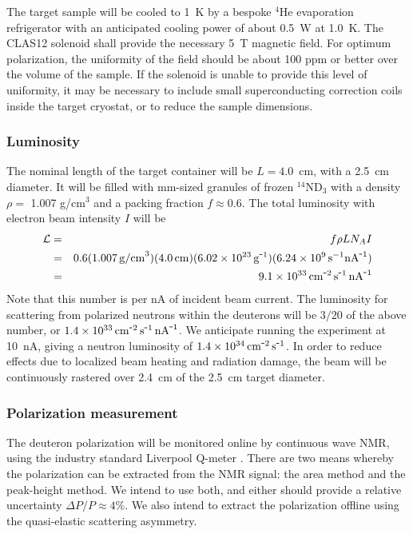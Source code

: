 The target sample will be cooled to 1~K by a bespoke $^4$He evaporation refrigerator with an anticipated cooling power of about 0.5~W at 1.0~K.  The CLAS12 solenoid shall provide the necessary 5~T magnetic field.  For optimum polarization, the uniformity of the field should be about 100 ppm or better over the volume of the sample.  If the solenoid is unable to provide this level of uniformity, it may be necessary to include small superconducting correction
coils inside the target cryostat, or to reduce the sample dimensions.  

\subsubsection{Luminosity}\label{sec_luminosity}
The nominal length of the target container will be $L=4.0$~cm, with a 2.5~cm diameter. 
It will be filled with mm-sized granules of frozen $^{14}$ND$_3$ with a density $\rho =$ 1.007 g/cm$^3$ and a packing fraction $f\approx0.6$.  The total luminosity with electron beam intensity $I$ will be 
\begin{eqnarray}
	\mathcal{L}  & = & f \rho L N_A I   \\
& = & 0.6(1.007\, {\rm g/cm}^3)(4.0\,{\rm cm})(6.02\times10^{23}\,{\rm g}^{\minus 1})(6.24\times10^9\,{\rm s}^{-1}{\rm nA}^{\minus 1}) \nonumber \\
	                   & = & 9.1 \times 10^{33} \, {\rm cm}^{\minus 2} \,{\rm s}^{\minus 1} \,{\rm nA}^{\minus 1} \nonumber
\end{eqnarray}
Note that this number is per nA of incident beam current.  
The luminosity for scattering from polarized neutrons
within the deuterons will be $3/20$ of the above number, or 
$1.4 \times 10^{33}\,{\rm cm}^{\minus 2} \, {\rm s}^{\minus 1} \, {\rm nA}^{\minus 1}$.
We anticipate running the experiment at 10~nA, giving a neutron luminosity of $1.4\times10^{34} 
\,{\rm cm}^{\minus 2} \, {\rm s}^{\minus 1}$.  In order to reduce effects due to localized beam heating and radiation damage, the beam will be continuously rastered over 2.4~cm of the 2.5~cm target diameter.


\subsubsection{Polarization measurement}\label{sec_target_polarization}
The deuteron polarization will be monitored online by continuous wave NMR, using the industry standard
Liverpool Q-meter \cite{Court1993}.    There are two means whereby the polarization can be extracted from the NMR signal: the area method and the peak-height method.  We intend to use both, and either should provide a relative uncertainty $\Delta P/P \approx 4$\%.  We also intend to extract the polarization offline using the
quasi-elastic scattering asymmetry.

